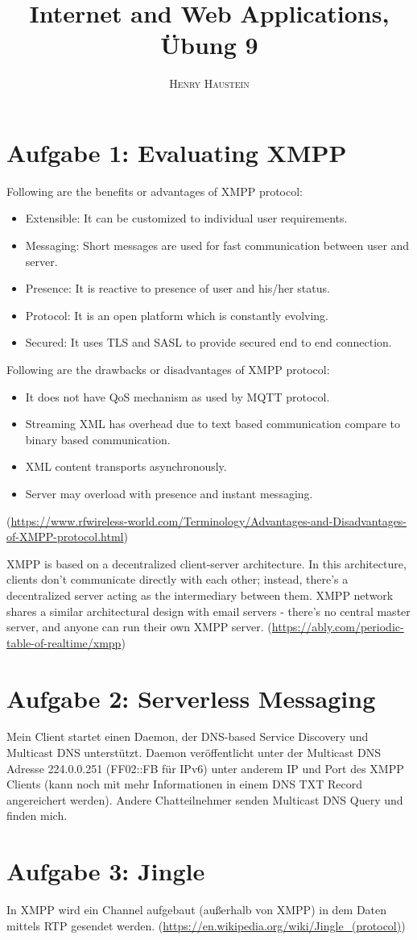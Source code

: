 \documentclass{article}
\title{\textbf{Internet and Web Applications, Übung 9}}
\author{\textsc{Henry Haustein}}
\date{}
\begin{document}
	\maketitle
	
	\section*{Aufgabe 1: Evaluating XMPP}
	Following are the benefits or advantages of XMPP protocol:
	\begin{itemize}
		\item Extensible: It can be customized to individual user requirements.
		\item Messaging: Short messages are used for fast communication between user and server.
		\item Presence: It is reactive to presence of user and his/her status.
		\item Protocol: It is an open platform which is constantly evolving.
		\item Secured: It uses TLS and SASL to provide secured end to end connection.
	\end{itemize}
	Following are the drawbacks or disadvantages of XMPP protocol:
	\begin{itemize}
		\item It does not have QoS mechanism as used by MQTT protocol.
		\item Streaming XML has overhead due to text based communication compare to binary based communication.
		\item XML content transports asynchronously.
		\item Server may overload with presence and instant messaging.
	\end{itemize}
	(\url{https://www.rfwireless-world.com/Terminology/Advantages-and-Disadvantages-of-XMPP-protocol.html})
	
	XMPP is based on a decentralized client-server architecture. In this architecture, clients don’t communicate directly with each other; instead, there’s a decentralized server acting as the intermediary between them. XMPP network shares a similar architectural design with email servers - there’s no central master server, and anyone can run their own XMPP server. (\url{https://ably.com/periodic-table-of-realtime/xmpp})
	
	\section*{Aufgabe 2: Serverless Messaging}
	Mein Client startet einen Daemon, der DNS-based Service Discovery und Multicast DNS unterstützt. Daemon veröffentlicht unter der Multicast DNS Adresse 224.0.0.251 (FF02::FB für IPv6) unter anderem IP und Port des XMPP Clients (kann noch mit mehr Informationen in einem DNS TXT Record angereichert werden). Andere Chatteilnehmer senden Multicast DNS Query und finden mich.
	
	\section*{Aufgabe 3: Jingle}
	In XMPP wird ein Channel aufgebaut (außerhalb von XMPP) in dem Daten mittels RTP gesendet werden. (\url{https://en.wikipedia.org/wiki/Jingle_(protocol)})
\end{document}
